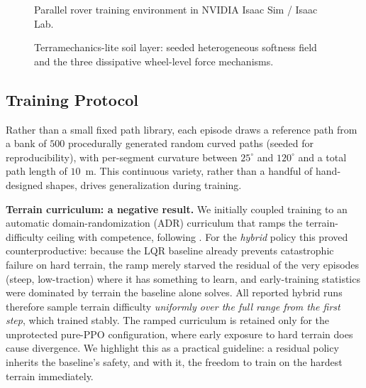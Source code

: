 \documentclass[conference]{IEEEtran}
\begin{document}
\begin{figure}[t]
\centering
{}
\caption{Parallel rover training environment in NVIDIA Isaac Sim / Isaac Lab.}
\label{fig:sim_screenshot}
\end{figure}

\begin{figure}[t]
\centering
{}
\caption{Terramechanics-lite soil layer: seeded heterogeneous softness field and the three dissipative wheel-level force mechanisms.}
\label{fig:soil_model}
\end{figure}

\subsection{Training Protocol}
\label{sec:training}
Rather than a small fixed path library, each episode draws a reference path from a bank of $500$ procedurally generated random curved paths (seeded for reproducibility), with per-segment curvature between $25^\circ$ and $120^\circ$ and a total path length of $10$~m. This continuous variety, rather than a handful of hand-designed shapes, drives generalization during training.

\vspace{1mm}
\noindent\textbf{Terrain curriculum: a negative result.} We initially coupled training to an automatic domain-randomization (ADR) curriculum that ramps the terrain-difficulty ceiling with competence, following \cite{rudin2022learning}. For the \emph{hybrid} policy this proved counterproductive: because the LQR baseline already prevents catastrophic failure on hard terrain, the ramp merely starved the residual of the very episodes (steep, low-traction) where it has something to learn, and early-training statistics were dominated by terrain the baseline alone solves. All reported hybrid runs therefore sample terrain difficulty \emph{uniformly over the full range from the first step}, which trained stably. The ramped curriculum is retained only for the unprotected pure-PPO configuration, where early exposure to hard terrain does cause divergence. We highlight this as a practical guideline: a residual policy inherits the baseline's safety, and with it, the freedom to train on the hardest terrain immediately.
\end{document}
